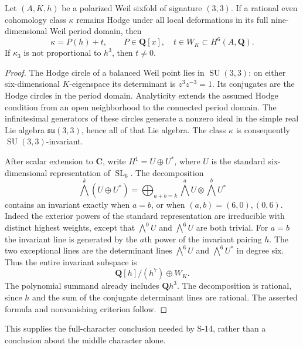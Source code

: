 \begin{proposition}
\label{SF-CM02}
Let $(A,K,h)$ be a polarized Weil sixfold of signature $(3,3)$.
If a rational even cohomology class $\kappa$ remains Hodge under
all local deformations in its full nine-dimensional Weil period
domain, then
\[
 \kappa=P(h)+t,\qquad P\in\mathbf Q[x],\quad t\in W_K\subset H^6(A,\mathbf Q).
\]
If $\kappa_3$ is not proportional to $h^3$, then $t\ne0$.
\end{proposition}
\begin{proof}
The Hodge circle of a balanced Weil point lies in $\operatorname{SU}(3,3)$:
on either six-dimensional $K$-eigenspace its determinant is
$z^3z^{-3}=1$. Its conjugates are the Hodge circles in the period
domain. Analyticity extends the assumed Hodge condition from an open
neighborhood to the connected period domain. The infinitesimal
generators of these circles generate a nonzero ideal in the simple
real Lie algebra $\mathfrak{su}(3,3)$, hence all of that Lie algebra.
The class $\kappa$ is consequently $\operatorname{SU}(3,3)$-invariant.

After scalar extension to $\mathbf C$, write $H^1=U\oplus U^*$,
where $U$ is the standard six-dimensional representation of
$\operatorname{SL}_6$. The decomposition
\[
 \bigwedge^k(U\oplus U^*)
 =\bigoplus_{a+b=k}\bigwedge^aU\otimes\bigwedge^bU^*
\]
contains an invariant exactly when $a=b$, or when
$(a,b)=(6,0),(0,6)$. Indeed the exterior powers of the standard
representation are irreducible with distinct highest weights, except
that $\bigwedge^0U$ and $\bigwedge^6U$ are both trivial. For $a=b$
the invariant line is generated by the $a$th power of the invariant
pairing $h$. The two exceptional lines are the determinant lines
$\bigwedge^6U$ and $\bigwedge^6U^*$ in degree six. Thus the entire
invariant subspace is
\[
 \mathbf Q[h]/(h^7)\oplus W_K.
\]
The polynomial summand already includes $\mathbf Qh^3$. The
decomposition is rational, since $h$ and the sum of the conjugate
determinant lines are rational. The asserted formula and nonvanishing
criterion follow.
\end{proof}
This supplies the full-character conclusion needed by S-14, rather
than a conclusion about the middle character alone.

